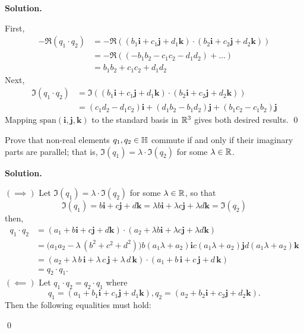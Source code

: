 \documentclass[12pt]{book}
\theoremstyle{definition}
\newenvironment{solution}
{%
  \par\noindent\textbf{Solution.}\quad
}
{%
  \qed\par
}
\begin{document}
\begin{solution}
  First,
  \[
  \begin{aligned}
    -\Re (q_1 \cdot q_2) &= -\Re ((b_1\mathbf{i} + c_1\mathbf{j} + d_1\mathbf{k}) \cdot (b_2\mathbf{i} + c_2\mathbf{j} + d_2\mathbf{k})) \\
                         &= -\Re((- b_1b_2 - c_1c_2 - d_1d_2) + \dots) \\
                         &= b_1b_2 + c_1c_2 + d_1d_2
  \end{aligned}
  \]
  Next, 
  \[
  \begin{aligned}
    \Im (q_1 \cdot q_2) &= \Im ((b_1\mathbf{i} + c_1\mathbf{j} + d_1\mathbf{k}) \cdot (b_2\mathbf{i} + c_2\mathbf{j} + d_2\mathbf{k})) \\
                        &= (c_1d_2 - d_1c_2)\mathbf{i} + (d_1b_2 - b_1d_2)\mathbf{j} + (b_1c_2 - c_1b_2)\mathbf{j}
  \end{aligned}
  \]
  Mapping $\text{span}(\mathbf{i},\mathbf{j},\mathbf{k})$ to the standard basis in $\mathbb{R}^3$ gives both desired results.
\end{solution}

\begin{taggedexercise}[WIP]
  Prove that non-real elements $q_1, q_2 \in \mathbb{H}$ commute if and only if their imaginary parts are parallel; that is, $\Im(q_1) = \lambda \cdot \Im(q_2)$ for some $\lambda \in \mathbb{R}$.
\end{taggedexercise}

\begin{solution}
  $(\implies)$ Let $\Im(q_1) = \lambda \cdot \Im(q_2)$ for some $\lambda \in \mathbb{R}$, so that
  \[
    \Im(q_1) = b\mathbf{i} + c\mathbf{j} + d\mathbf{k} = \lambda b\mathbf{i} + \lambda c\mathbf{j} + \lambda d\mathbf{k} = \Im(q_2)
  \]
  then,
  \[
  \begin{aligned}
    q_1 \cdot q_2 &= (a_1 + b\mathbf{i} + c\mathbf{j} + d\mathbf{k})\cdot (a_2 + \lambda b\mathbf{i} + \lambda c\mathbf{j} + \lambda d \mathbf{k}) 
    \\
    &=
    \bigl(a_1 a_2 - \lambda\,(b^2 + c^2 + d^2)\bigr)
    b(a_1 \lambda + a_2)\mathbf{i}
    c(a_1 \lambda + a_2)\mathbf{j}
    d(a_1 \lambda + a_2)\mathbf{k} \\
    &= 
    (a_2 + \lambda\,b\,\mathbf{i} + \lambda\,c\,\mathbf{j} + \lambda\,d\,\mathbf{k}) 
    \cdot (a_1 + b\,\mathbf{i} + c\,\mathbf{j} + d\,\mathbf{k}) \\
    &= q_2 \cdot q_1.
    \end{aligned}
  \]
  $(\impliedby)$ Let $q_1 \cdot q_2 = q_2 \cdot q_1$ where
  \[
    q_1 = (a_1 + b_1\mathbf{i} + c_1\mathbf{j} + d_1\mathbf{k}), q_2 = (a_2 + b_2\mathbf{i} + c_2\mathbf{j} + d_2\mathbf{k}).
  \]
  Then the following equalities must hold:

\end{solution}
\end{document}
